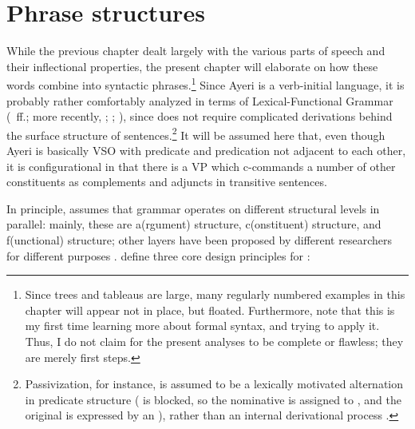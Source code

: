 
\chapter{Phrase structures}
\label{ch:phrasestruct}

While the previous chapter dealt largely with the various parts of speech and
their inflectional properties, the present chapter will elaborate on how these
words combine into syntactic phrases.\footnote{Since trees and tableaus are
large, many regularly numbered examples in this chapter will appear not in
place, but floated. Furthermore, note that this is my first time learning more
about formal syntax, and trying to apply it. Thus, I do not claim for the
present analyses to be complete or flawless; they are merely first steps.}
Since Ayeri is a verb-initial language, it is probably rather comfortably
analyzed in terms of Lexical-Functional Grammar (\cite{bresnan1982}~ff.; more
recently, \cite{bresnan2016}; \cite{dalrymple2001}; \cite{falk2001}), since
\Lfg{} does not require complicated derivations behind the surface structure of
sentences.\footnote{Passivization, for instance, is
assumed to be a lexically motivated alternation in predicate structure (\Subj{}
is blocked, so the nominative is assigned to \Obj{}, and the original \Subj{}
is expressed by an ), rather than an internal derivational process
\citep[23\psqq]{bresnan2016}.} It will be assumed here that, even though Ayeri
is basically VSO with predicate and predication not adjacent to each other, it
is configurational in that there is a VP which
c-commands a number of other constituents as complements and adjuncts in
transitive sentences.


In principle, \Lfg{} assumes that grammar operates on different structural
levels in parallel: mainly, these are a(rgument) structure, c(onstituent)
structure, and f(unctional) structure; other layers have been proposed by
different researchers for different purposes \citep[862--865]{buttking2015}.
\citet{bresnan2016} define three core design principles for \Lfg{}:

